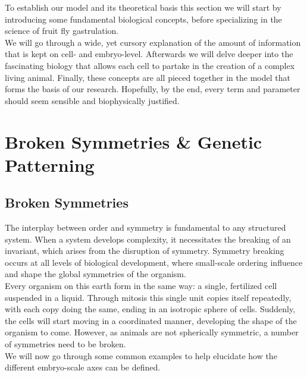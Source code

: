 To establish our model and its theoretical basis this section we will start by introducing some fundamental biological concepts, before specializing in the science of fruit fly gastrulation. \\
We  will go through a wide, yet cursory explanation of the amount of information that is kept on cell- and embryo-level. Afterwards we will delve deeper into the fascinating biology that allows each cell to partake in the creation of a complex living animal. Finally, these concepts are all pieced together in the model that forms the basis of our research. Hopefully, by the end, every term and parameter should seem sensible and biophysically justified. 

\section{\hspace{-0.2cm}Broken Symmetries \& Genetic Patterning}
\label{sec:theory-polarity}
\subsection{Broken Symmetries}
The interplay between order and symmetry is fundamental to any structured system. When a system develops complexity, it necessitates the breaking of an invariant, which arises from the disruption of symmetry.\cite{anderson1972more}
Symmetry breaking occurs at all levels of biological development, where small-scale ordering influence and shape the global symmetries of the organism. \\

Every organism on this earth form in the same way: a single, fertilized cell suspended in a liquid. Through mitosis this single unit copies itself repeatedly, with each copy doing the same, ending in an isotropic sphere of cells. Suddenly, the cells will start moving in a coordinated manner, developing the shape of the organism to come. However, as animals are not spherically symmetric, a number of symmetries need to be broken. \\

We will now go through some common examples to help elucidate how the different embryo-scale axes can be defined.\\

